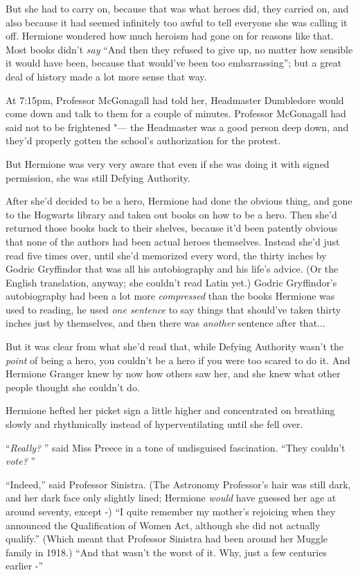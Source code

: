 But she had to carry on, because that was what heroes did, they carried
on, and also because it had seemed infinitely too awful to tell everyone
she was calling it off. Hermione wondered how much heroism had gone on
for reasons like that. Most books didn't \emph{say} ``And then they
refused to give up, no matter how sensible it would have been, because
that would've been too embarrassing''; but a great deal of history made
a lot more sense that way.

At 7:15pm, Professor McGonagall had told her, Headmaster Dumbledore
would come down and talk to them for a couple of minutes. Professor
McGonagall had said not to be frightened "--- the Headmaster was a good
person deep down, and they'd properly gotten the school's authorization
for the protest.

But Hermione was very very aware that even if she was doing it with
signed permission, she was still Defying Authority.

After she'd decided to be a hero, Hermione had done the obvious thing,
and gone to the Hogwarts library and taken out books on how to be a
hero. Then she'd returned those books back to their shelves, because
it'd been patently obvious that none of the authors had been actual
heroes themselves. Instead she'd just read five times over, until she'd
memorized every word, the thirty inches by Godric Gryffindor that was
all his autobiography and his life's advice. (Or the English
translation, anyway; she couldn't read Latin yet.) Godric Gryffindor's
autobiography had been a lot more \emph{compressed} than the books
Hermione was used to reading, he used \emph{one sentence} to say things
that should've taken thirty inches just by themselves, and then there
was \emph{another} sentence after that...

But it was clear from what she'd read that, while Defying Authority
wasn't the \emph{point} of being a hero, you couldn't be a hero if you
were too scared to do it. And Hermione Granger knew by now how others
saw her, and she knew what other people thought she couldn't do.

Hermione hefted her picket sign a little higher and concentrated on
breathing slowly and rhythmically instead of hyperventilating until she
fell over.

``\emph{Really?} '' said Miss Preece in a tone of undisguised fascination.
``They couldn't \emph{vote?} ''

``Indeed,'' said Professor Sinistra. (The Astronomy Professor's hair was
still dark, and her dark face only slightly lined; Hermione \emph{would}
have guessed her age at around seventy, except -) ``I quite remember my
mother's rejoicing when they announced the Qualification of Women Act,
although she did not actually qualify.'' (Which meant that Professor
Sinistra had been around her Muggle family in 1918.) ``And that wasn't
the worst of it. Why, just a few centuries earlier -''

